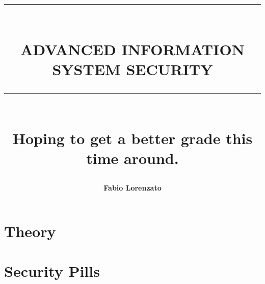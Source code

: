 \documentclass{report}
\newcommand{\HRule}[1]{\rule{\linewidth}{#1}}
\begin{document}

\title{ \normalsize \textsc{}
		\\ [2.0cm]
		\HRule{1.5pt} \\
    \LARGE \textbf{\uppercase{Advanced Information System Security}}
		\HRule{2.0pt} \\ [0.6cm] \LARGE{Hoping to get a better grade this time around.} \vspace*{10\baselineskip}}
\author{\textbf{Fabio Lorenzato}} 
		

\maketitle
\newpage

\tableofcontents
\newpage
\part{Theory}









\part{Security Pills}

\end{document}
